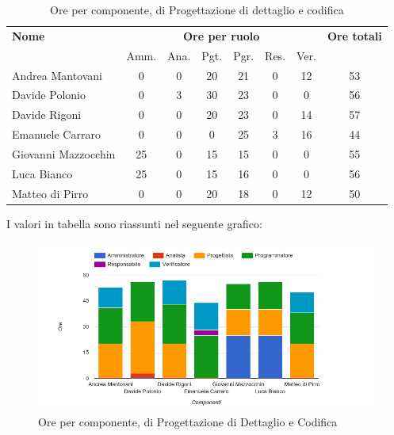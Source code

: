 \begin{table}[H]
\begin{tabular}{lccccccc}
\toprule
    \textbf{Nome}  & \multicolumn{6}{c}{\textbf{Ore per ruolo}} & \textbf{Ore totali} \\
     & Amm. & Ana. & Pgt. & Pgr. & Res. & Ver. & \\
    \midrule
    
	   Andrea Mantovani & 0 & 0 & 20 & 21 & 0 & 12 & 53 \\
	     Davide Polonio & 0 & 3 & 30 & 23 & 0 & 0 & 56 \\
	      Davide Rigoni & 0 & 0 & 20 & 23 & 0 & 14 & 57 \\
	   Emanuele Carraro & 0 & 0 & 0 & 25 & 3 & 16 & 44 \\
	Giovanni Mazzocchin & 25 & 0 & 15 & 15 & 0 & 0 & 55 \\
	        Luca Bianco & 25 & 0 & 15 & 16 & 0 & 0 & 56 \\
	    Matteo di Pirro & 0 & 0 & 20 & 18 & 0 & 12 & 50 \\
    
    
    \bottomrule
\end{tabular}
\caption{Ore per componente,  di Progettazione di dettaglio e codifica}
\end{table}

I valori in tabella sono riassunti nel seguente grafico: \\ 

    \begin{figure}[H]
      \begin{center}
        \includegraphics[width=15cm]{res/img/suddivisioneRuoloProspettoOrario/orePerComponenteProgettazioneDettaglioCodifica.png}
      \caption{Ore per componente,  di Progettazione di Dettaglio e Codifica}
      \end{center} 
    \end{figure}    
    
